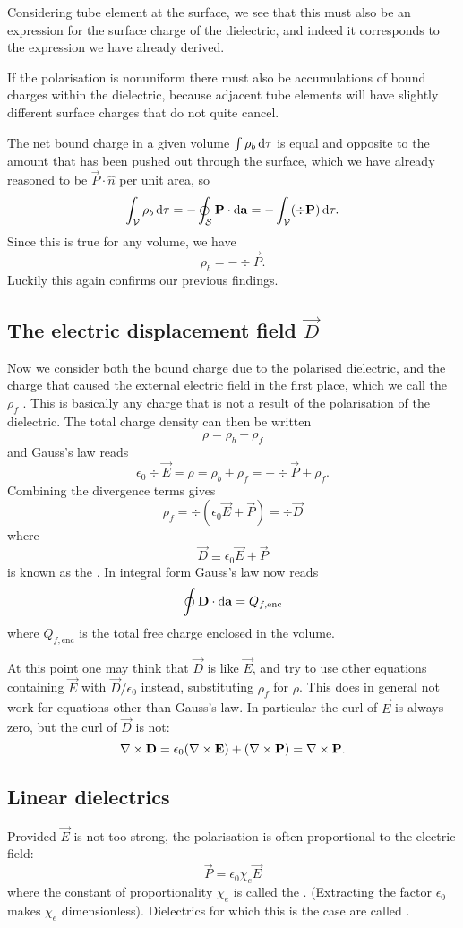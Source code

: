 Considering tube element at the surface, we see that this must also be an expression for the surface charge of the dielectric, and indeed it corresponds to the expression we have already derived.

If the polarisation is nonuniform there must also be accumulations of bound charges within the dielectric, because adjacent tube elements will have slightly different surface charges that do not quite cancel.

The net bound charge in a given volume $\int \rho_b \operatorname{d \!}{\tau}$ is equal and opposite to the amount that has been pushed out through the surface, which we have already reasoned to be $\vec{P}\cdot \hat{n}$ per unit area, so
\[ \int_\mathcal{V} \rho_b \operatorname{d \!}{\tau} = - \oint_\mathcal{S} \bm{\mathrm{P}}\cdot \operatorname{d \!}{\bm{\mathrm{a}}} = - \int_\mathcal{V} (\div \bm{\mathrm{P}})\operatorname{d \!}{\tau}. \]
Since this is true for any volume, we have
\[ \rho_b = - \div \vec{P}. \]
Luckily this again confirms our previous findings.

\subsection[The electric displacement field \textbf{D}]{The electric displacement field $\vec{D}$}
Now we consider both the bound charge due to the polarised dielectric, and the charge that caused the external electric field in the first place, which we call the  $\rho_f$ . This is basically any charge that is not a result of the polarisation of the dielectric. The total charge density can then be written
\[ \rho = \rho_b + \rho_f \]
and Gauss's law reads
\[ \epsilon_0 \div \vec{E} = \rho = \rho_b + \rho_f = - \div \vec{P} + \rho_f. \]
Combining the divergence terms gives
\[ \rho_f  = \div(\epsilon_0 \vec{E} + \vec{P}) = \div \vec{D} \]
where
\[ \vec{D} \equiv \epsilon_0 \vec{E} + \vec{P} \]
is known as the . In integral form Gauss's law now reads
\[ \oint \bm{\mathrm{D}}\cdot \operatorname{d \!}{\bm{\mathrm{a}}} = Q_{f,\text{enc}} \]
where $Q_{f,\text{enc}}$ is the total free charge enclosed in the volume.

At this point one may think that $\vec{D}$ is like $\vec{E}$, and try to use other equations containing $\vec{E}$ with $\vec{D}/\epsilon_0$ instead, substituting $\rho_f$ for $\rho$. This does in general not work for equations other than Gauss's law. In particular the curl of $\vec{E}$ is always zero, but the curl of $\vec{D}$ is not:
\[ \mathop{}\! \nabla\times \bm{\mathrm{D}} = \epsilon_0 (\mathop{}\! \nabla\times \bm{\mathrm{E}}) + (\mathop{}\! \nabla\times \bm{\mathrm{P}}) = \mathop{}\! \nabla\times \bm{\mathrm{P}}. \]
\subsection{Linear dielectrics}
Provided $\vec{E}$ is not too strong, the polarisation is often proportional to the electric field:
\[ \vec{P} = \epsilon_0\chi_e \vec{E} \]
where the constant of proportionality $\chi_e$ is called the . (Extracting the factor $\epsilon_0$ makes $\chi_e$ dimensionless). Dielectrics for which this is the case are called .

